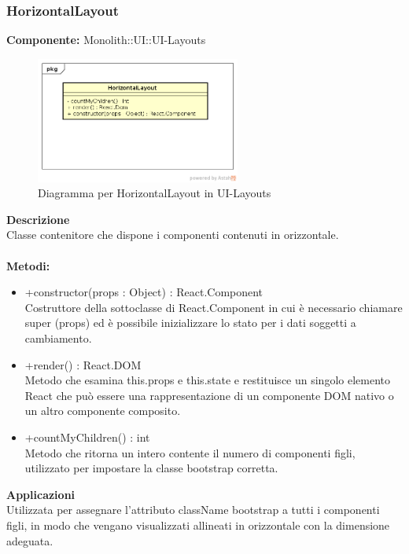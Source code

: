 \subsubsection{HorizontalLayout}
\textbf{Componente:}  Monolith::UI::UI-Layouts\\
   \FloatBarrier
   \begin{figure}[ht]
   \centering
   \includegraphics[width=0.6\textwidth]{img/single-HorizontalLayout}
   \caption{{Diagramma per HorizontalLayout in UI-Layouts}}
\end{figure}
\FloatBarrier
\textbf{Descrizione}\\
Classe contenitore che dispone i componenti contenuti in orizzontale. \\\\
\textbf{Metodi:} \begin{itemize}\item +constructor(props : Object) : React.Component \\Costruttore della sottoclasse di React.Component in cui è necessario chiamare super (props) ed è possibile inizializzare lo stato per i dati soggetti a cambiamento.\item +render() : React.DOM \\Metodo che esamina this.props e this.state e restituisce un singolo elemento React che può essere una rappresentazione di un componente DOM nativo o un altro componente composito.\item +countMyChildren() : int \\Metodo che ritorna un intero contente il numero di componenti figli, utilizzato per impostare la classe bootstrap corretta.\end{itemize} 


\textbf{Applicazioni}\\
Utilizzata per assegnare l'attributo className bootstrap a tutti i componenti figli, in modo che vengano visualizzati allineati in orizzontale con la dimensione adeguata. 


\clearpage

